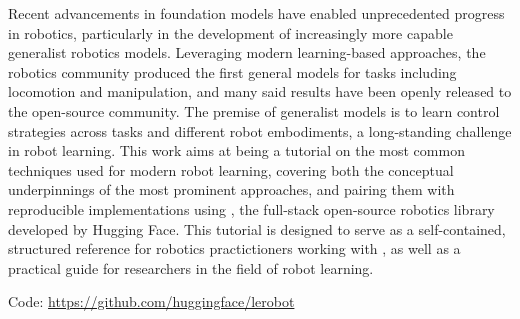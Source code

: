 Recent advancements in foundation models have enabled unprecedented progress in robotics, particularly in the development of increasingly more capable generalist robotics models.
Leveraging modern learning-based approaches, the robotics community produced the first general models for tasks including locomotion and manipulation, and many said results have been openly released to the open-source community.
The premise of generalist models is to learn control strategies across tasks and different robot embodiments, a long-standing challenge in robot learning.
This work aims at being a tutorial on the most common techniques used for modern robot learning, covering both the conceptual underpinnings of the most prominent approaches, and pairing them with reproducible implementations using \lerobot, the full-stack open-source robotics library developed by Hugging Face.
This tutorial is designed to serve as a self-contained, structured reference for robotics practictioners working with \lerobot, as well as a practical guide for researchers in the field of robot learning.

Code: \url{https://github.com/huggingface/lerobot}